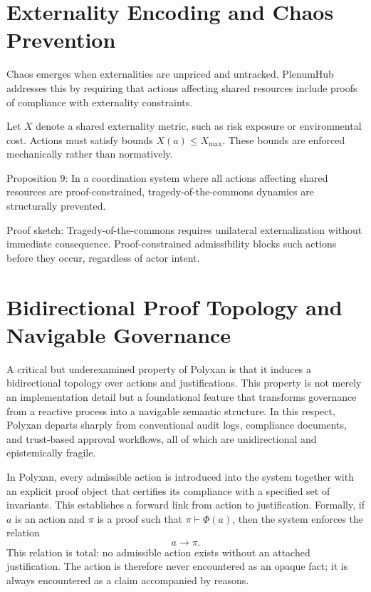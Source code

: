 \documentclass[11pt,oneside]{article}
\begin{document}
\section{Externality Encoding and Chaos Prevention}

Chaos emerges when externalities are unpriced and untracked. PlenumHub addresses this by requiring that actions affecting shared resources include proofs of compliance with externality constraints.

Let \( X \) denote a shared externality metric, such as risk exposure or environmental cost. Actions must satisfy bounds \( X(a) \leq X_{\max} \). These bounds are enforced mechanically rather than normatively.

Proposition 9: In a coordination system where all actions affecting shared resources are proof-constrained, tragedy-of-the-commons dynamics are structurally prevented.

Proof sketch: Tragedy-of-the-commons requires unilateral externalization without immediate consequence. Proof-constrained admissibility blocks such actions before they occur, regardless of actor intent.

\section{Bidirectional Proof Topology and Navigable Governance}

A critical but underexamined property of Polyxan is that it induces a bidirectional topology over actions and justifications. This property is not merely an implementation detail but a foundational feature that transforms governance from a reactive process into a navigable semantic structure. In this respect, Polyxan departs sharply from conventional audit logs, compliance documents, and trust-based approval workflows, all of which are unidirectional and epistemically fragile.

In Polyxan, every admissible action is introduced into the system together with an explicit proof object that certifies its compliance with a specified set of invariants. This establishes a forward link from action to justification. Formally, if \( a \) is an action and \( \pi \) is a proof such that \( \pi \vdash \Phi(a) \), then the system enforces the relation
\[
a \rightarrow \pi.
\]
This relation is total: no admissible action exists without an attached justification. The action is therefore never encountered as an opaque fact; it is always encountered as a claim accompanied by reasons.
\end{document}
